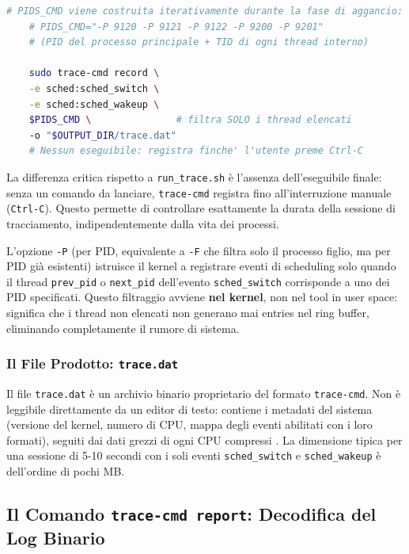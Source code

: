 \begin{lstlisting}[language=bash, caption={Invocazione di trace-cmd record in marker.sh con filtraggio per PID}]
	# PIDS_CMD viene costruita iterativamente durante la fase di aggancio:
	# PIDS_CMD="-P 9120 -P 9121 -P 9122 -P 9200 -P 9201"
	# (PID del processo principale + TID di ogni thread interno)
	
	sudo trace-cmd record \
	-e sched:sched_switch \
	-e sched:sched_wakeup \
	$PIDS_CMD \               # filtra SOLO i thread elencati
	-o "$OUTPUT_DIR/trace.dat"
	# Nessun eseguibile: registra finche' l'utente preme Ctrl-C
\end{lstlisting}

La differenza critica rispetto a \texttt{run\_trace.sh} è l'assenza dell'eseguibile finale: senza un comando da lanciare, \texttt{trace-cmd} registra fino all'interruzione manuale (\texttt{Ctrl-C}). Questo permette di controllare esattamente la durata della sessione di tracciamento, indipendentemente dalla vita dei processi.

L'opzione \texttt{-P} (per PID, equivalente a \texttt{-F} che filtra solo il processo figlio, ma per PID già esistenti) istruisce il kernel a registrare eventi di scheduling solo quando il thread \texttt{prev\_pid} o \texttt{next\_pid} dell'evento \texttt{sched\_switch} corrisponde a uno dei PID specificati. Questo filtraggio avviene \textbf{nel kernel}, non nel tool in user space: significa che i thread non elencati non generano mai entries nel ring buffer, eliminando completamente il rumore di sistema.

\subsubsection{Il File Prodotto: \texttt{trace.dat}}

Il file \texttt{trace.dat} è un archivio binario proprietario del formato \texttt{trace-cmd}. Non è leggibile direttamente da un editor di testo: contiene i metadati del sistema (versione del kernel, numero di CPU, mappa degli eventi abilitati con i loro formati), seguiti dai dati grezzi di ogni CPU compressi \cite{tracecmd_record_man}. La dimensione tipica per una sessione di 5-10 secondi con i soli eventi \texttt{sched\_switch} e \texttt{sched\_wakeup} è dell'ordine di pochi MB.

\subsection{Il Comando \texttt{trace-cmd report}: Decodifica del Log Binario}

